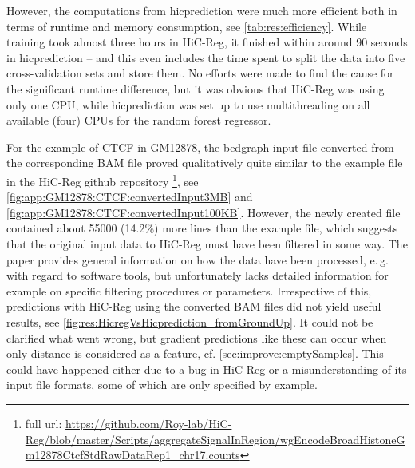 However, the computations from hicprediction were much more efficient both in terms of runtime and memory consumption,
see \autoref{tab:res:efficiency}. While training took almost three hours in HiC-Reg, it finished within around 90 seconds
in hicprediction -- and this even includes the time spent to split the data into five cross-validation sets and store them.
No efforts were made to find the cause for the significant runtime difference, 
but it was obvious that HiC-Reg was using only one CPU, while hicprediction was set up to use multithreading on
all available (four) CPUs for the random forest regressor.
\begin{table}[htb]
\caption{computational effort HiC-Reg vs. hicprediction} \label{tab:res:efficiency}
\end{table}

For the example of CTCF in GM12878, the bedgraph input file converted from the corresponding BAM file 
proved qualitatively quite similar to the example file in the HiC-Reg github repository 
\cite{Roy2020}\footnote{full url: 
\url{https://github.com/Roy-lab/HiC-Reg/blob/master/Scripts/aggregateSignalInRegion/wgEncodeBroadHistoneGm12878CtcfStdRawDataRep1_chr17.counts}},
see \autoref{fig:app:GM12878:CTCF:convertedInput3MB} and \ref{fig:app:GM12878:CTCF:convertedInput100KB}.
However, the newly created file contained about \num{55000} (14.2\%) more lines than the example file, 
which suggests that the original input data to HiC-Reg must have been filtered in some way. 
The paper \cite{Zhang2019} provides general information on how the data have been processed,
e.\,g. with regard to software tools, but unfortunately lacks detailed information for example on specific filtering procedures or parameters.
Irrespective of this, predictions with HiC-Reg using the converted BAM files did not yield useful results, see 
\autoref{fig:res:HicregVsHicprediction_fromGroundUp}.
It could not be clarified what went wrong, 
but gradient predictions like these can occur when only distance is
considered as a feature, cf. \autoref{sec:improve:emptySamples}.
This could have happened either due to a bug in HiC-Reg 
or a misunderstanding of its input file formats, some of which are 
only specified by example.

